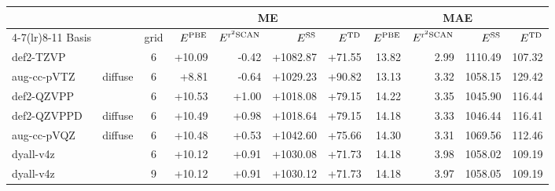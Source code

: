 \begin{tabular}{@{}llc rrrr rrrr@{}}
\toprule
 & & & \multicolumn{4}{c}{ME} & \multicolumn{4}{c}{MAE} \\
\cmidrule(lr){4-7}\cmidrule(lr){8-11}
Basis & & grid & $E^{\rm PBE}$ & $E^{{\rm r}^2{\rm SCAN}}$ & $E^{\rm SS}$ & $E^{\rm TD}$ & $E^{\rm PBE}$ & $E^{{\rm r}^2{\rm SCAN}}$ & $E^{\rm SS}$ & $E^{\rm TD}$ \\
\midrule
def2-TZVP &  & 6 & \textcolor{pyscfred}{+10.09} & \textcolor{pyscfred}{-0.42} & \textcolor{pyscfred}{+1082.87} & \textcolor{pyscfred}{+71.55} & \textcolor{pyscfred}{13.82} & \textcolor{pyscfred}{2.99} & \textcolor{pyscfred}{1110.49} & \textcolor{pyscfred}{107.32} \\
aug-cc-pVTZ & diffuse & 6 & \textcolor{pyscfred}{+8.81} & \textcolor{pyscfred}{-0.64} & \textcolor{pyscfred}{+1029.23} & \textcolor{pyscfred}{+90.82} & \textcolor{pyscfred}{13.13} & \textcolor{pyscfred}{3.32} & \textcolor{pyscfred}{1058.15} & \textcolor{pyscfred}{129.42} \\
def2-QZVPP &  & 6 & \textcolor{pyscfred}{+10.53} & \textcolor{pyscfred}{+1.00} & \textcolor{pyscfred}{+1018.08} & \textcolor{pyscfred}{+79.15} & \textcolor{pyscfred}{14.22} & \textcolor{pyscfred}{3.35} & \textcolor{pyscfred}{1045.90} & \textcolor{pyscfred}{116.44} \\
def2-QZVPPD & diffuse & 6 & \textcolor{pyscfred}{+10.49} & \textcolor{pyscfred}{+0.98} & \textcolor{pyscfred}{+1018.64} & \textcolor{pyscfred}{+79.15} & \textcolor{pyscfred}{14.18} & \textcolor{pyscfred}{3.33} & \textcolor{pyscfred}{1046.44} & \textcolor{pyscfred}{116.41} \\
aug-cc-pVQZ & diffuse & 6 & \textcolor{pyscfred}{+10.48} & \textcolor{pyscfred}{+0.53} & \textcolor{pyscfred}{+1042.60} & \textcolor{pyscfred}{+75.66} & \textcolor{pyscfred}{14.30} & \textcolor{pyscfred}{3.31} & \textcolor{pyscfred}{1069.56} & \textcolor{pyscfred}{112.46} \\
dyall-v4z &  & 6 & \textcolor{pyscfred}{+10.12} & \textcolor{pyscfred}{+0.91} & \textcolor{pyscfred}{+1030.08} & \textcolor{pyscfred}{+71.73} & \textcolor{pyscfred}{14.18} & \textcolor{pyscfred}{3.98} & \textcolor{pyscfred}{1058.02} & \textcolor{pyscfred}{109.19} \\
dyall-v4z &  & 9 & \textcolor{pyscfred}{+10.12} & \textcolor{pyscfred}{+0.91} & \textcolor{pyscfred}{+1030.12} & \textcolor{pyscfred}{+71.73} & \textcolor{pyscfred}{14.18} & \textcolor{pyscfred}{3.97} & \textcolor{pyscfred}{1058.05} & \textcolor{pyscfred}{109.19} \\
\bottomrule
\end{tabular}
